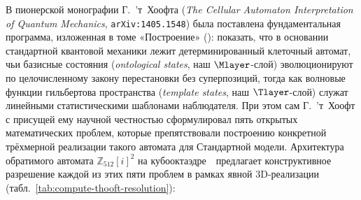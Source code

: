 В пионерской монографии Г.~’т~Хоофта \textcite{tHooft2016} (\emph{The Cellular Automaton Interpretation of Quantum Mechanics}, \texttt{arXiv:1405.1548}) была поставлена фундаментальная программа, изложенная в томе «Построение» (): показать, что в основании стандартной квантовой механики лежит детерминированный клеточный автомат, чьи базисные состояния (\emph{ontological states}, наш $\Mlayer$-слой) эволюционируют по целочисленному закону перестановки без суперпозиций, тогда как волновые функции гильбертова пространства (\emph{template states}, наш $\Tlayer$-слой) служат линейными статистическими шаблонами наблюдателя.
При этом сам Г.~’т~Хоофт с присущей ему научной честностью сформулировал пять открытых математических проблем, которые препятствовали построению конкретной трёхмерной реализации такого автомата для Стандартной модели.
Архитектура обратимого автомата $\mathbb{Z}_{512}[i]^2$ на кубооктаэдре~\latGCKshort\ предлагает конструктивное разрешение каждой из этих пяти проблем в рамках явной 3D-реализации (табл.~\ref{tab:compute-thooft-resolution}):

